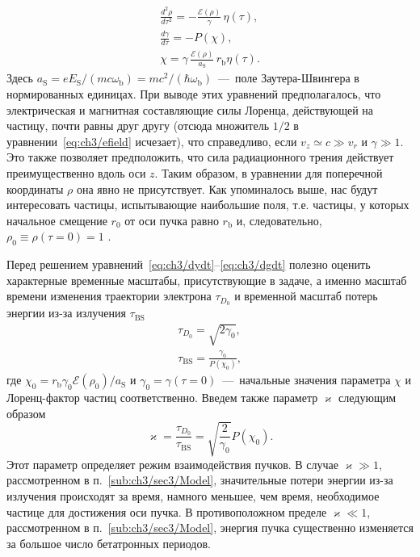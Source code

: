 \begin{gather}
    \label{eq:ch3/dydt}
    \frac{d^2\rho}{d\tau^2}  =  -\frac{\mathcal{E}(\rho) }{\gamma} \,\eta(\tau),   \\
    \label{eq:ch3/dgdt}
    \frac{d\gamma}{d\tau}  =  -P(\chi),  \\
    \label{eq:ch3/c2}
    \chi  =  \gamma\, \frac{\mathcal{E}(\rho)}{a_\mathrm{S}} \,r_\mathrm{b} \eta(\tau).
\end{gather}
Здесь $a_\mathrm{S} = e E_\mathrm{S} / (m c \omega_\mathrm{b}) = mc^2 /(\hbar \omega_\mathrm{b})$~---~поле Заутера-Швингера в нормированных единицах.
При выводе этих уравнений предполагалось, что электрическая и магнитная составляющие силы Лоренца, действующей на частицу, почти равны друг другу (отсюда множитель $1/2$ в уравнении~\eqref{eq:ch3/efield} исчезает), что справедливо, если $v_z \simeq c \gg v_r$ и $\gamma\gg 1$.
Это также позволяет предположить, что сила радиационного трения действует преимущественно вдоль оси $z$.
Таким образом, в уравнении для поперечной координаты $\rho$ она явно не присутствует.
Как упоминалось выше, нас будут интересовать частицы, испытывающие наибольшие поля, т.е. частицы, у которых начальное смещение $r_0$ от оси пучка равно $r_\mathrm{b}$ и, следовательно, $\rho_0 \equiv \rho(\tau=0) = 1$ .

Перед решением уравнений~\eqref{eq:ch3/dydt}--\eqref{eq:ch3/dgdt} полезно оценить характерные временные масштабы, присутствующие в задаче, а именно масштаб времени изменения траектории электрона $\tau_{ D_0}$ и временной масштаб потерь энергии из-за излучения $\tau_\mathrm{BS}$
\begin{gather}
    \tau_{D_0} = \sqrt{2\gamma_0}, \\
    \tau_\mathrm{BS} = \frac{\gamma_0}{P(\chi_0)},
\end{gather}
где $\chi_0 = r_\mathrm{b} \gamma_0 \mathcal{E}\left( \rho_0 \right) / a_\mathrm{S} $ и $\gamma_0 = \gamma(\tau = 0)$~---~начальные значения параметра $\chi$ и Лоренц-фактор частиц соответственно.
Введем также параметр $\varkappa$ следующим образом
\begin{equation}
    \label{eq:ch3/condition}
    \varkappa = \frac{\tau_{D_0}}{\tau_\mathrm{BS}} = \sqrt{\frac{2}{\gamma_0}}P(\chi_0).
\end{equation}
Этот параметр определяет режим взаимодействия пучков.
В случае $\varkappa \gg 1$, рассмотренном в п.~\ref{sub:ch3/sec3/Model}, значительные потери энергии из-за излучения происходят за время, намного меньшее, чем время, необходимое частице для достижения оси пучка.
В противоположном пределе $\varkappa \ll 1$, рассмотренном в п.~\ref{sub:ch3/sec3/Model}, энергия пучка существенно изменяется за большое число бетатронных периодов.


